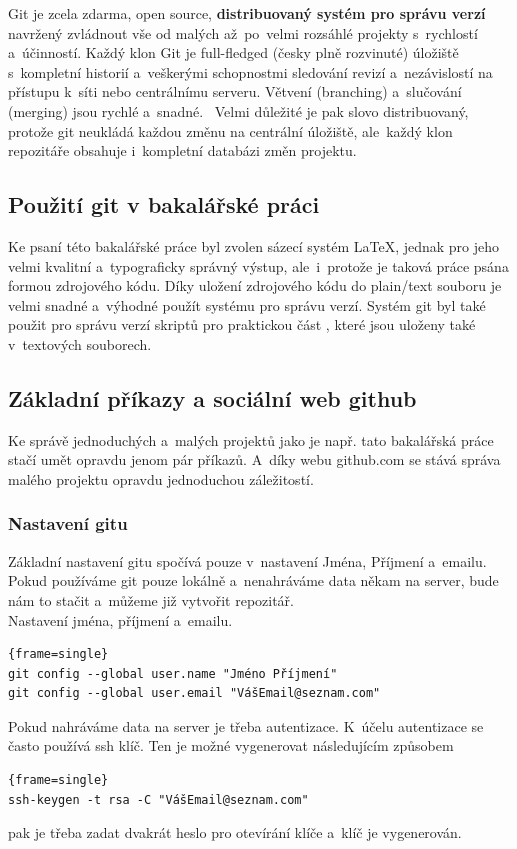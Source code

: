 \documentclass[a4paper,12pt,twoside,BCOR=10mm]{article}
\renewcommand{\b}[1]{\textbf{#1}} %
\newenvironment{codeframe}{%
  \begin{Sbox} 
    \begin{minipage} 
      {\columnwidth-\leftmargin-\rightmargin-2\fboxsep-2\fboxrule-4pt} 
}{%

  \end{minipage} 
  \end{Sbox} 
  \begin{center} 
    \fcolorbox{black}{codeback}{\TheSbox} 
  \end{center} 
}
\begin{document}
Git je zcela zdarma, open source, \b{distribuovaný systém pro správu verzí} navržený zvládnout vše od malých až~po~velmi rozsáhlé projekty s~rychlostí a~účinností. Každý klon Git je full-fledged (česky plně rozvinuté) úložiště s~kompletní historií a~veškerými schopnostmi sledování revizí a~nezávislostí na přístupu k~síti nebo centrálnímu serveru. Větvení (branching) a~slučování (merging) jsou rychlé a~snadné.~\cite{GITWEB} Velmi důležité je pak slovo distribuovaný, protože git neukládá každou změnu na centrální úložiště, ale~každý klon repozitáře obsahuje i~kompletní databázi změn projektu.

\subsection{Použití git v bakalářské práci}
Ke psaní této bakalářské práce byl zvolen sázecí systém \LaTeX, jednak pro jeho velmi kvalitní a~typograficky správný výstup, ale~i~protože je taková práce psána formou zdrojového kódu. Díky uložení zdrojového kódu do plain/text souboru je velmi snadné a~výhodné použít systému pro správu verzí. Systém git byl také použit pro správu verzí skriptů pro praktickou část , které jsou uloženy také v~textových souborech.

\subsection[Základní příkazy a github]{Základní příkazy a sociální web github}
Ke správě jednoduchých a~malých projektů jako je např. tato bakalářská práce stačí umět opravdu jenom pár příkazů. A~díky webu github.com se stává správa malého projektu opravdu jednoduchou záležitostí.\\

\subsubsection{Nastavení gitu}
Základní nastavení gitu spočívá pouze v~nastavení Jména, Příjmení a~emailu. Pokud používáme git pouze lokálně a~nenahráváme data někam na server, bude nám to stačit a~můžeme již vytvořit repozitář.\\

Nastavení jména, příjmení a~emailu.~\cite{GIThelpNastaveni}
    \begin{codeframe}
      \begin{Verbatim}{frame=single}
git config --global user.name "Jméno Příjmení"
git config --global user.email "VášEmail@seznam.com"
\end{Verbatim} 
    \end{codeframe}
Pokud nahráváme data na server je třeba autentizace. K~účelu autentizace se často používá ssh klíč. Ten je možné vygenerovat následujícím způsobem~\cite{GIThelpNastaveni}
    \begin{codeframe}
      \begin{Verbatim}{frame=single}
ssh-keygen -t rsa -C "VášEmail@seznam.com"
\end{Verbatim} 
    \end{codeframe}
pak je třeba zadat dvakrát heslo pro otevírání klíče a~klíč je vygenerován.\\
\end{document}

